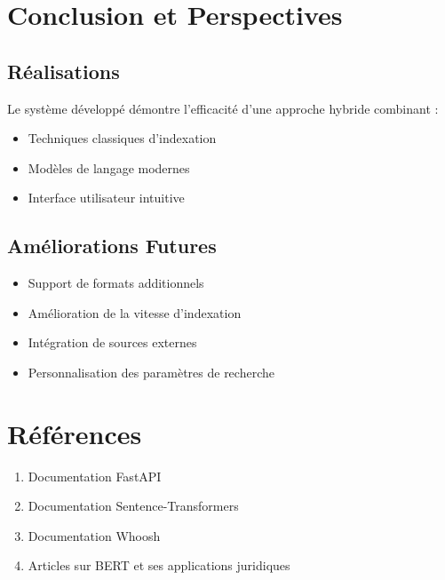 \documentclass[12pt,a4paper]{article}
\begin{document}
\section{Conclusion et Perspectives}

\subsection{Réalisations}
Le système développé démontre l'efficacité d'une approche hybride combinant :
\begin{itemize}
    \item Techniques classiques d'indexation
    \item Modèles de langage modernes
    \item Interface utilisateur intuitive
\end{itemize}

\subsection{Améliorations Futures}
\begin{itemize}
    \item Support de formats additionnels
    \item Amélioration de la vitesse d'indexation
    \item Intégration de sources externes
    \item Personnalisation des paramètres de recherche
\end{itemize}

\section{Références}
\begin{enumerate}
    \item Documentation FastAPI
    \item Documentation Sentence-Transformers
    \item Documentation Whoosh
    \item Articles sur BERT et ses applications juridiques
\end{enumerate}
\end{document}
